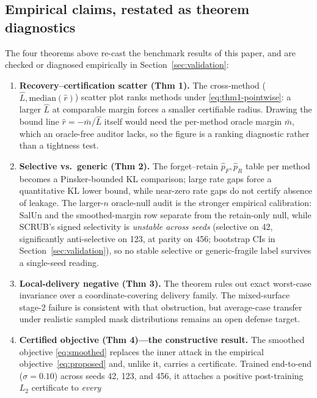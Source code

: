\subsection{Empirical claims, restated as theorem diagnostics}
\label{sec:restated}

The four theorems above re-cast the benchmark results of this paper, and are
checked or diagnosed empirically in Section~\ref{sec:validation}:

\begin{enumerate}[leftmargin=1.5em,topsep=0pt]
  \item \textbf{Recovery--certification scatter (Thm 1).} The
    cross-method ($\hat L, \mathrm{median}(\hat r)$) scatter plot ranks
    methods under \eqref{eq:thm1-pointwise}: a larger $\hat L$ at comparable
    margin forces a smaller certifiable radius. Drawing the bound line
    $\hat r = -\bar m / \hat L$ itself would need the per-method oracle margin
    $\bar m$, which an oracle-free auditor lacks, so the figure is a ranking
    diagnostic rather than a tightness test.
  \item \textbf{Selective vs.\ generic (Thm 2).} The forget--retain $\hat
    p_F, \hat p_R$ table per method becomes a Pinsker-bounded KL comparison;
    large rate gaps force a quantitative KL lower bound, while near-zero rate
    gaps do not certify absence of leakage. The larger-$n$ oracle-null audit
    is the stronger empirical calibration: SalUn and the smoothed-margin row
    separate from the retain-only null, while SCRUB's signed selectivity is
    \emph{unstable across seeds} (selective on 42, significantly anti-selective
    on 123, at parity on 456; bootstrap CIs in Section~\ref{sec:validation}),
    so no stable selective or generic-fragile label survives a single-seed
    reading.
  \item \textbf{Local-delivery negative (Thm 3).} The theorem rules out
    exact worst-case invariance over a coordinate-covering delivery family.
    The mixed-surface stage-2 failure is consistent with that obstruction, but
    average-case transfer under realistic sampled mask distributions remains
    an open defense target.
  \item \textbf{Certified objective (Thm 4)---the constructive result.} The
    smoothed objective \eqref{eq:smoothed} replaces the inner attack in the
    empirical objective~\eqref{eq:proposed} and, unlike it, carries a
    certificate. Trained end-to-end ($\sigma = 0.10$) across seeds 42, 123, and
    456, it attaches a positive post-training $L_2$ certificate to \emph{every}

\end{enumerate}
